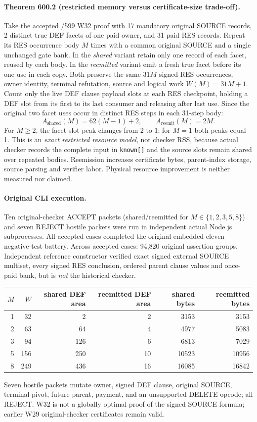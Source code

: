 \documentclass[11pt]{article}
\begin{document}
\paragraph{Theorem 600.2 (restricted memory versus certificate-size trade-off).}
Take the accepted /599 W32 proof with 17 mandatory original SOURCE records, 2 distinct true DEF facets of one paid owner, and 31 paid RES records. Repeat its RES occurrence body $M$ times with a common original SOURCE and a single unchanged gate bank. In the \emph{shared} variant retain only one record of each facet, reused by each body. In the \emph{reemitted} variant emit a fresh true facet before its one use in each copy. Both preserve the same $31M$ signed RES occurrences, owner identity, terminal refutation, source and logical work $W(M)=31M+1$.
Count only the live DEF clause payload slots at each RES checkpoint, holding a DEF slot from its first to its last consumer and releasing after last use. Since the original two facet uses occur in distinct RES steps in each 31-step body:
\[
 A_{\mathrm{shared}}(M)=62(M-1)+2,\qquad
 A_{\mathrm{reemit}}(M)=2M.
\]
For $M\ge2$, the facet-slot peak changes from 2 to 1; for $M=1$ both peaks equal 1. This is an \emph{exact restricted resource model}, not checker RSS, because actual checker records the complete input in \texttt{known[]} and the source slots remain shared over repeated bodies. Reemission increases certificate bytes, parent-index storage, source parsing and verifier labor. Physical resource improvement is neither measured nor claimed.

\paragraph{Original CLI execution.}
Ten original-checker ACCEPT packets (shared/reemitted for $M\in\{1,2,3,5,8\}$) and seven REJECT hostile packets were run in independent actual Node.js subprocesses. All accepted cases completed the original embedded eleven-negative-test battery. Across accepted cases: 94,820 original assertion groups. Independent reference constructor verified exact signed external SOURCE multiset, every signed RES conclusion, ordered parent clause values and once-paid bank, but is \emph{not} the historical checker.
\begin{center}
\begin{tabular}{r|r|r|r|r|r}
$M$&$W$&shared DEF area&reemitted DEF area&shared bytes&reemitted bytes\\\hline
1&32&2&2&3153&3153\\
2&63&64&4&4977&5083\\
3&94&126&6&6813&7029\\
5&156&250&10&10523&10956\\
8&249&436&16&16085&16842
\end{tabular}
\end{center}
Seven hostile packets mutate owner, signed DEF clause, original SOURCE, terminal pivot, future parent, payment, and an unsupported DELETE opcode; all REJECT. W32 is not a globally optimal proof of the signed SOURCE formula; earlier W29 original-checker certificates remain valid.
\end{document}
